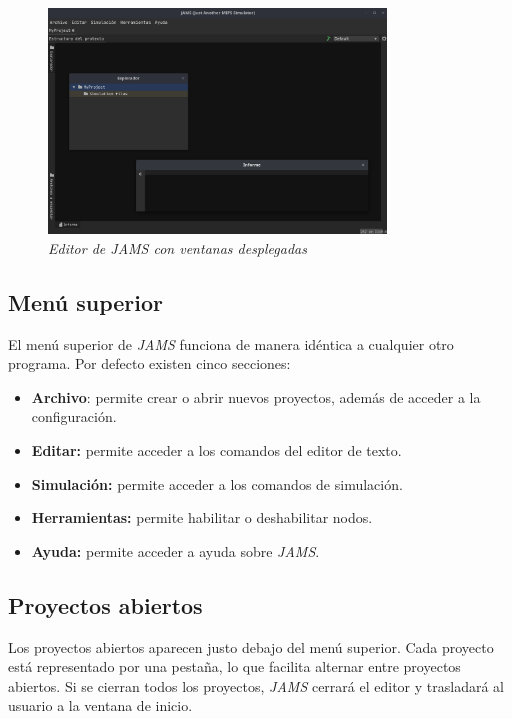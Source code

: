 \begin{figure}[H]
    \centering
    \includegraphics[width=0.8\textwidth]{images/base/jams-windows}
    \caption{\textit{Editor de \textit{JAMS} con ventanas desplegadas}}
    \label{fig:jams-windows}
\end{figure}

\subsection{Menú superior}\label{subsec:menu-superior}

El menú superior de \textit{JAMS} funciona de manera idéntica a cualquier otro programa.
Por defecto existen cinco secciones:
\begin{itemize}
    \item \textbf{Archivo}: permite crear o abrir nuevos proyectos, además de
    acceder a la configuración.
    \item \textbf{Editar:} permite acceder a los comandos del editor de texto.
    \item \textbf{Simulación:} permite acceder a los comandos de simulación.
    \item \textbf{Herramientas:} permite habilitar o deshabilitar nodos.
    \item \textbf{Ayuda:} permite acceder a ayuda sobre \textit{JAMS}.
\end{itemize}

\subsection{Proyectos abiertos}\label{subsec:proyectos-abiertos}

Los proyectos abiertos aparecen justo debajo del menú superior.
Cada proyecto está representado por una pestaña, lo que facilita alternar entre
proyectos abiertos.
Si se cierran todos los proyectos, \textit{JAMS} cerrará el editor y trasladará
al usuario a la ventana de inicio.

